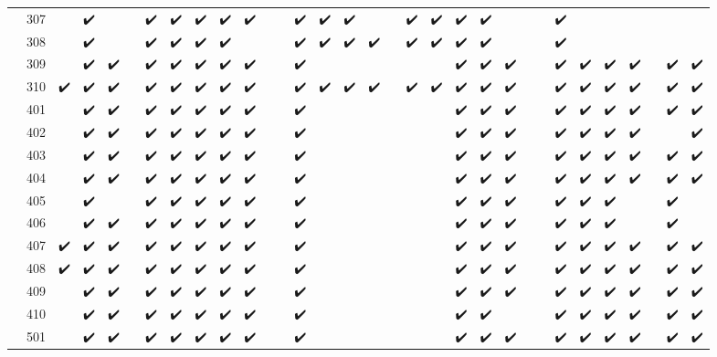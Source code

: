 \begin{tabular}{llcccccccccccccccccccccccccccccc}
 & 307 &  & ✔️ &  &  & ✔️ & ✔️ & ✔️ & ✔️ & ✔️ &  &  & ✔️ & ✔️ & ✔️ &  &  & ✔️ & ✔️ & ✔️ & ✔️ &  &  &  & ✔️ &  &  &  &  &  &  \\
 & 308 &  & ✔️ &  &  & ✔️ & ✔️ & ✔️ & ✔️ &  &  &  & ✔️ & ✔️ & ✔️ & ✔️ &  & ✔️ & ✔️ & ✔️ & ✔️ &  &  &  & ✔️ &  &  &  &  &  &  \\
 & 309 &  & ✔️ & ✔️ &  & ✔️ & ✔️ & ✔️ & ✔️ & ✔️ &  &  & ✔️ &  &  &  &  &  &  & ✔️ & ✔️ & ✔️ &  &  & ✔️ & ✔️ & ✔️ & ✔️ &  & ✔️ & ✔️ \\
 & 310 & ✔️ & ✔️ & ✔️ &  & ✔️ & ✔️ & ✔️ & ✔️ & ✔️ &  &  & ✔️ & ✔️ & ✔️ & ✔️ &  & ✔️ & ✔️ & ✔️ & ✔️ & ✔️ &  &  & ✔️ & ✔️ & ✔️ & ✔️ &  & ✔️ & ✔️ \\
 & 401 &  & ✔️ & ✔️ &  & ✔️ & ✔️ & ✔️ & ✔️ & ✔️ &  &  & ✔️ &  &  &  &  &  &  & ✔️ & ✔️ & ✔️ &  &  & ✔️ & ✔️ & ✔️ & ✔️ &  & ✔️ & ✔️ \\
 & 402 &  & ✔️ & ✔️ &  & ✔️ & ✔️ & ✔️ & ✔️ & ✔️ &  &  & ✔️ &  &  &  &  &  &  & ✔️ & ✔️ & ✔️ &  &  & ✔️ & ✔️ & ✔️ & ✔️ &  &  & ✔️ \\
 & 403 &  & ✔️ & ✔️ &  & ✔️ & ✔️ & ✔️ & ✔️ & ✔️ &  &  & ✔️ &  &  &  &  &  &  & ✔️ & ✔️ & ✔️ &  &  & ✔️ & ✔️ & ✔️ & ✔️ &  & ✔️ & ✔️ \\
 & 404 &  & ✔️ & ✔️ &  & ✔️ & ✔️ & ✔️ & ✔️ & ✔️ &  &  & ✔️ &  &  &  &  &  &  & ✔️ & ✔️ & ✔️ &  &  & ✔️ & ✔️ & ✔️ & ✔️ &  & ✔️ & ✔️ \\
 & 405 &  & ✔️ &  &  & ✔️ & ✔️ & ✔️ & ✔️ & ✔️ &  &  & ✔️ &  &  &  &  &  &  & ✔️ & ✔️ & ✔️ &  &  & ✔️ & ✔️ & ✔️ &  &  & ✔️ &  \\
 & 406 &  & ✔️ & ✔️ &  & ✔️ & ✔️ & ✔️ & ✔️ & ✔️ &  &  & ✔️ &  &  &  &  &  &  & ✔️ & ✔️ & ✔️ &  &  & ✔️ & ✔️ & ✔️ &  &  & ✔️ &  \\
 & 407 & ✔️ & ✔️ & ✔️ &  & ✔️ & ✔️ & ✔️ & ✔️ & ✔️ &  &  & ✔️ &  &  &  &  &  &  & ✔️ & ✔️ & ✔️ &  &  & ✔️ & ✔️ & ✔️ & ✔️ &  & ✔️ & ✔️ \\
 & 408 & ✔️ & ✔️ & ✔️ &  & ✔️ & ✔️ & ✔️ & ✔️ & ✔️ &  &  & ✔️ &  &  &  &  &  &  & ✔️ & ✔️ & ✔️ &  &  & ✔️ & ✔️ & ✔️ & ✔️ &  & ✔️ & ✔️ \\
 & 409 &  & ✔️ & ✔️ &  & ✔️ & ✔️ & ✔️ & ✔️ & ✔️ &  &  & ✔️ &  &  &  &  &  &  & ✔️ & ✔️ & ✔️ &  &  & ✔️ & ✔️ & ✔️ & ✔️ &  & ✔️ & ✔️ \\
 & 410 &  & ✔️ & ✔️ &  & ✔️ & ✔️ & ✔️ & ✔️ & ✔️ &  &  & ✔️ &  &  &  &  &  &  & ✔️ & ✔️ &  &  &  & ✔️ & ✔️ & ✔️ & ✔️ &  & ✔️ & ✔️ \\
 & 501 &  & ✔️ & ✔️ &  & ✔️ & ✔️ & ✔️ & ✔️ & ✔️ &  &  & ✔️ &  &  &  &  &  &  & ✔️ & ✔️ & ✔️ &  &  & ✔️ & ✔️ & ✔️ & ✔️ &  & ✔️ & ✔️ \\

\end{tabular}
